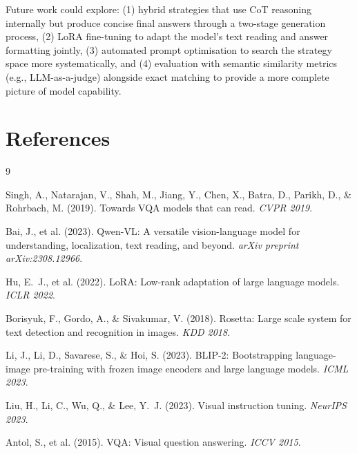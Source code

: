 \documentclass[11pt]{article}
\begin{document}
Future work could explore: (1) hybrid strategies that use CoT reasoning internally but produce concise final answers through a two-stage generation process, (2) LoRA fine-tuning to adapt the model's text reading and answer formatting jointly, (3) automated prompt optimisation to search the strategy space more systematically, and (4) evaluation with semantic similarity metrics (e.g., LLM-as-a-judge) alongside exact matching to provide a more complete picture of model capability.


\section{References}

\begin{thebibliography}{9}

Singh, A., Natarajan, V., Shah, M., Jiang, Y., Chen, X., Batra, D., Parikh, D., \& Rohrbach, M. (2019).
Towards VQA models that can read.
\textit{CVPR 2019}.

Bai, J., et al. (2023).
Qwen-VL: A versatile vision-language model for understanding, localization, text reading, and beyond.
\textit{arXiv preprint arXiv:2308.12966}.

Hu, E.~J., et al. (2022).
LoRA: Low-rank adaptation of large language models.
\textit{ICLR 2022}.

Borisyuk, F., Gordo, A., \& Sivakumar, V. (2018).
Rosetta: Large scale system for text detection and recognition in images.
\textit{KDD 2018}.

Li, J., Li, D., Savarese, S., \& Hoi, S. (2023).
BLIP-2: Bootstrapping language-image pre-training with frozen image encoders and large language models.
\textit{ICML 2023}.

Liu, H., Li, C., Wu, Q., \& Lee, Y.~J. (2023).
Visual instruction tuning.
\textit{NeurIPS 2023}.

Antol, S., et al. (2015).
VQA: Visual question answering.
\textit{ICCV 2015}.

\end{thebibliography}
\end{document}
